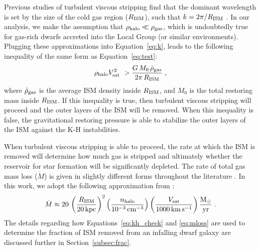 Previous studies of turbulent viscous stripping find that the dominant
wavelength is set by the size of the cold gas region ($R_{\rm ISM}$),
such that $k = 2\pi / R_{\rm ISM}$ \citep{nulsen82, murray93}.  In our
analysis, we make the assumption that $\rho_{\rm halo} \ll \rho_{\rm
  gas}$, which is undoubtedly true for gas-rich dwarfs accreted into
the Local Group (or similar environments). Plugging these
approximations into Equation~\ref{eq:k}, leads to the following
inequality of the same form as Equation~\ref{eq:test}:
%
\begin{equation}
  \rho_{\rm halo} V_{\rm sat}^{2} \ > \frac{G \, M_{0} \, \bar{\rho}_{\rm
      gas}}{2 \pi \, R_{\rm ISM}}  \; ,
\label{eq:kh_check}
\end{equation}
%
where $\bar{\rho}_{\rm gas}$ is the average ISM density inside $R_{\rm
  ISM}$, and $M_{0}$ is the total restoring mass inside $R_{\rm
  ISM}$. If this inequality is true, then turbulent viscous stripping
will proceed and the outer layers of the ISM will be removed. When
this inequality is false, the gravitational restoring pressure is able
to stabilize the outer layers of the ISM against the K-H instabilities.
%

When turbulent viscous stripping is able to proceed, the rate at which
the ISM is removed will determine how much gas is stripped and
ultimately whether the reservoir for star formation will be
significantly depleted. The rate of total gas mass loss ($\dot{M}$) is
given in slightly different forms throughout the literature
\citep[e.g.][]{nulsen82, mori00, roediger05}. In this work, we adopt
the following approximation from \citet{roediger05}:
%
\begin{equation}
  \dot{M} \approx 20 \, \left (\frac{R_{\rm ISM}}{20 \, {\rm kpc}} \right )^{2}
  \left (\frac{n_{\rm halo}}{10^{-3} \, {\rm cm}^{-3}} \right ) \left
    (\frac{V_{\rm sat}}{1000 \, {\rm km} \, {\rm s}^{-1}} \right )
\frac{{\rm M}_{\odot}}{\rm yr} \; .
\label{eq:mloss}
\end{equation}
%
The details regarding how Equations~\ref{eq:kh_check} and
\ref{eq:mloss} are used to determine the fraction of ISM removed from
an infalling dwarf galaxy are discussed further in
Section~\ref{subsec:frac}. 



